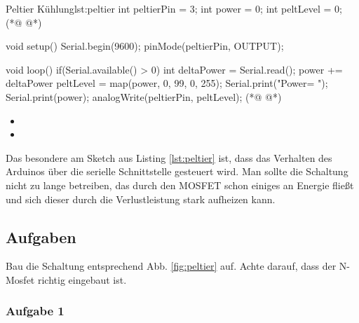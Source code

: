 \begin{multicols}{2}
\begin{arduinoCode}{Peltier Kühlung}{lst:peltier}
int peltierPin = 3; 
int power = 0; 
int peltLevel = 0; (*@  @*) 

void setup(){
  Serial.begin(9600);
  pinMode(peltierPin, OUTPUT);
}

void loop(){
  if(Serial.available() > 0) {
    int deltaPower = Serial.read();
    power += deltaPower
    peltLevel = map(power, 0, 99, 0, 255);
  }
  Serial.print("Power= ");
  Serial.print(power);
  analogWrite(peltierPin, peltLevel); (*@  @*)
}
\end{arduinoCode}
\columnbreak
\vfill\null 
\begin{itemize}
  \itemsep20pt
    \item[] 
    \item[] 
 \end{itemize}
\vfill \null

\end{multicols}



Das besondere am Sketch aus Listing \ref{lst:peltier} ist, dass das Verhalten des Arduinos über die serielle Schnittstelle gesteuert wird. Man sollte die Schaltung nicht zu lange betreiben, das durch den MOSFET schon einiges an Energie fließt und sich dieser durch die Verlustleistung stark aufheizen kann.


\subsection{Aufgaben}

Bau die Schaltung entsprechend Abb. \ref{fig:peltier} auf. Achte darauf, dass der N-Mosfet richtig eingebaut ist. 

\subsubsection{Aufgabe 1}

